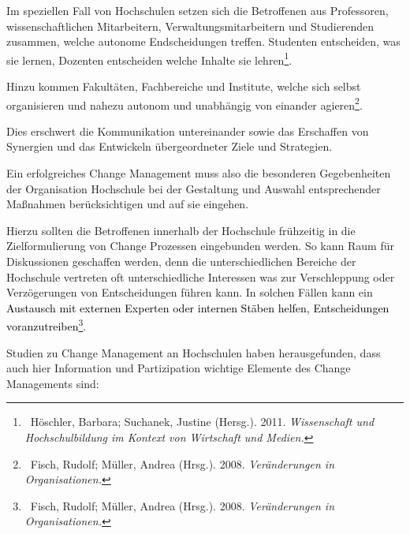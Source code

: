 \documentclass[a4paper]{article}
\begin{document}
\bigskip

{\sffamily
Im speziellen Fall von Hochschulen setzen sich die Betroffenen aus Professoren, wissenschaftlichen Mitarbeitern,
Verwaltungsmitarbeitern und Studierenden zusammen, welche autonome Endscheidungen treffen. Studenten entscheiden, was
sie lernen, Dozenten entscheiden welche Inhalte sie
lehren\footnote{\textsf{\textcolor[rgb]{0.12941177,0.11764706,0.11764706}{\ Höschler, Barbara; Suchanek, Justine
(Hersg.). 2011. }}\textsf{\textit{\textcolor[rgb]{0.12941177,0.11764706,0.11764706}{Wissenschaft und Hochschulbildung
im Kontext von Wirtschaft und Medien.}}}}.}


\bigskip

{\sffamily
Hinzu kommen Fakultäten, Fachbereiche und Institute, welche sich selbst organisieren und nahezu autonom und unabhängig
von einander agieren\footnote{\textcolor[rgb]{0.12941177,0.11764706,0.11764706}{\ Fisch, Rudolf; Müller, Andrea
(Hrsg.). 2008. }\textit{\textcolor[rgb]{0.12941177,0.11764706,0.11764706}{Veränderungen in Organisationen.}}}. }

{\sffamily
Dies erschwert die Kommunikation untereinander sowie das Erschaffen von Synergien und das Entwickeln übergeordneter
Ziele und Strategien. \ \ \ }


\bigskip

{\sffamily
Ein erfolgreiches Change Management muss also die besonderen Gegebenheiten der Organisation Hochschule bei der
Gestaltung und Auswahl entsprechender Maßnahmen berücksichtigen und auf sie eingehen. }


\bigskip

{\sffamily
Hierzu sollten die Betroffenen innerhalb der Hochschule frühzeitig in die Zielformulierung von Change Prozessen
eingebunden werden. So kann Raum für Diskussionen geschaffen werden, denn die unterschiedlichen Bereiche der Hochschule
vertreten oft unterschiedliche Interessen was zur Verschleppung oder Verzögerungen von Entscheidungen führen kann. In
solchen Fällen kann ein \textcolor{black}{Austausch mit externen Experten oder internen Stäben helfen, Entscheidungen
voranzutreiben}\footnote{\textcolor[rgb]{0.12941177,0.11764706,0.11764706}{\ Fisch, Rudolf; Müller, Andrea (Hrsg.).
2008. }\textit{\textcolor[rgb]{0.12941177,0.11764706,0.11764706}{Veränderungen in
Organisationen.}}}\textcolor{black}{.}}

{\sffamily
Studien zu Change Management an Hochschulen haben herausgefunden, dass auch hier Information und Partizipation wichtige
Elemente des Change Managements sind:}
\end{document}

